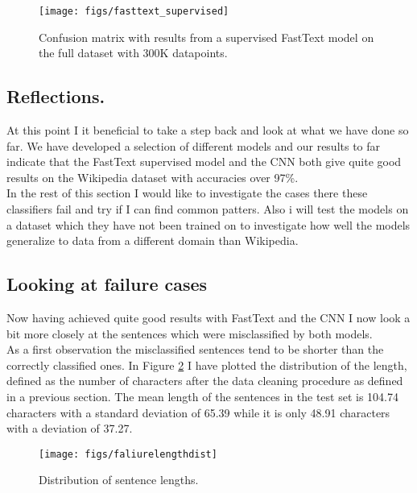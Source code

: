 \begin{figure}[h!]
  \centering
  \texttt{[image: figs/fasttext\_supervised]}
  \caption{Confusion matrix with results from a supervised FastText model on the full dataset with 300K datapoints.}
  \label{fasttext_supervised}
\end{figure}

\subsection{Reflections.}
At this point I it beneficial to take a step back and look at what we have done so far. We have developed a selection of different models and our results to far indicate that the FastText supervised model and the CNN both give quite good results on the Wikipedia dataset with accuracies over 97\%. \\

In the rest of this section I would like to investigate the cases there these classifiers fail and try if I can find common patters. Also i will test the models on a dataset which they have not been trained on to investigate how well the models generalize to data from a different domain than Wikipedia. \\


\subsection{Looking at failure cases}
Now having achieved quite good results with FastText and the CNN I now look a bit more closely at the sentences which were misclassified by both models. \\

As a first observation the misclassified sentences tend to be shorter than the correctly classified ones. In Figure \ref{faliurelengthdist} I have plotted the distribution of the length, defined as the number of characters after the data cleaning procedure as defined in a previous section. The mean length of the sentences in the test set is 104.74 characters with a standard deviation of 65.39 while it is only 48.91 characters with a deviation  of 37.27. \\

\begin{figure}[h!]
    \centering
    \texttt{[image: figs/faliurelengthdist]}
    \caption{Distribution of sentence lengths.}
    \label{faliurelengthdist}
\end{figure}

